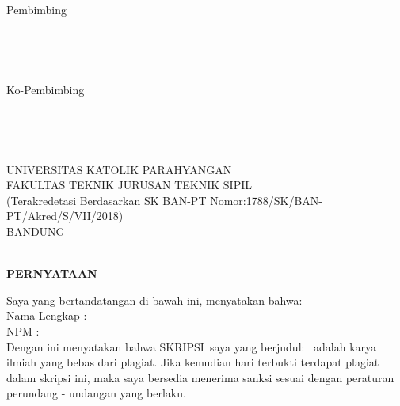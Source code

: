 \documentclass[11pt,a4paper,oneside,openright,notitlepage]{report}
\newcommand{\vstaINA}{SKRIPSI}
\begin{document}
{{{\begin{center}
{{\begin{center}
{\begin{center}
			    \vpembu\end{center}}
			{\begin{minipage}[b]{0.475\textwidth}
				 \begin{center}Pembimbing \\ 
				 {\begin{Form} \ \digsigfield{5cm}{2.5cm}{\vpembu}\ \end{Form}\\} 
				 \vpembu\end{center}
			 \end{minipage} \hspace{0.3cm}
			 \begin{minipage}[b]{0.475\textwidth}
				 \begin{center} Ko-Pembimbing \\
				 {\begin{Form} \ \digsigfield{5cm}{2.5cm}{\vpembs}\ \end{Form}\\}
				 \vpembs\end{center}
			 \end{minipage}	
			}
		\end{center}
		\vfill
		UNIVERSITAS KATOLIK PARAHYANGAN\\
		FAKULTAS TEKNIK JURUSAN TEKNIK SIPIL\\
		\small (Terakredetasi Berdasarkan SK BAN-PT Nomor:1788/SK/BAN-PT/Akred/S/VII/2018)\\
		BANDUNG\\
		\MakeUppercase{\vbulan}\ \vtahun 
		}}
	\end{center}
	\newpage
	
	\begin{center} 
		{\Large \textbf{PERNYATAAN}\\} \vspace{1cm}
	\end{center}
	\begin{flushleft}
Saya yang bertandatangan di bawah ini, menyatakan bahwa: \\\vspace{0.2cm}
Nama Lengkap : \vnama \\\vspace{0.2cm}
NPM \hspace{1.65cm}: \vnpm \\\vspace{0.2cm}
Dengan ini menyatakan bahwa \vstaINA\ saya yang berjudul: \vjudulINA\ adalah karya ilmiah yang bebas dari plagiat. Jika kemudian hari terbukti terdapat plagiat dalam skripsi ini, maka saya bersedia menerima sanksi sesuai dengan peraturan perundang - undangan yang berlaku. \\
	\vspace{0.25cm}
	\end{flushleft}
	
}}}
\end{document}
